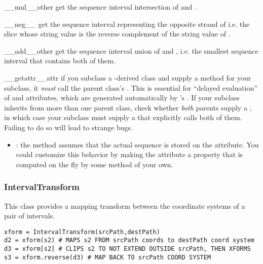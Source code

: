 \documentclass{howto}
\begin{document}
\begin{funcdesc}{__mul__}{other}
  get the sequence interval intersection of  and .
\end{funcdesc}

\begin{funcdesc}{__neg__}{}
  get the sequence interval representing the opposite strand of  
  i.e. the slice whose string value is the reverse complement of the string
  value of .
\end{funcdesc}

\begin{funcdesc}{__add__}{other}
  get the sequence interval union of  and , i.e.
  the smallest sequence interval that contains both of them.
\end{funcdesc}


\begin{funcdesc}{__getattr__}{attr}
  if you subclass a -derived class and supply a 
  method for your subclass, it {\em must} call the parent class's 
  .  This is essential for ``delayed evaluation'' of
   and  attributes, which are generated automatically
  by 's .  If your subclass inherits from
  more than one parent class, check whether {\em both} parents supply a 
  , in which case your subclass must supply a
   that explicitly calls both of them.  Failing to do so
  will lead to strange bugs.
\end{funcdesc}

\begin{itemize}
\item
{}: the  method assumes that 
the actual sequence is stored
on the  attribute.  You could customize this behavior by 
making the  attribute a property that is computed on the fly
by some method of your own.

\end{itemize}


\subsubsection{IntervalTransform}
This class provides a mapping transform between the coordinate
systems of a pair of intervals.

\begin{verbatim}
xform = IntervalTransform(srcPath,destPath)
d2 = xform(s2) # MAPS s2 FROM srcPath coords to destPath coord system
d3 = xform[s2] # CLIPS s2 TO NOT EXTEND OUTSIDE srcPath, THEN XFORMS
s3 = xform.reverse(d3) # MAP BACK TO srcPath COORD SYSTEM
\end{verbatim}
\end{document}
